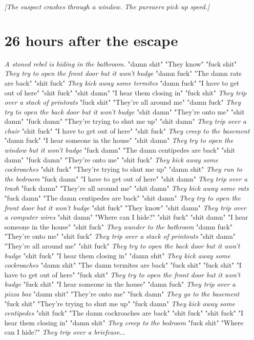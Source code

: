 \documentclass{report}
\begin{document}
\textit{[The suspect crashes through a window. The pursuers pick up speed.]}


\section*{26 \small{hours after the escape}}

\textit{A stoned rebel is hiding in the bathroom.} "damn shit" "They know" "fuck shit" \textit{They try to open the front door but it won't budge} "damn fuck" "The damn rats are back" "shit fuck" \textit{They kick away some termites} "damn fuck" "I have to get out of here" "shit fuck" \textit{} "shit damn" "I hear them closing in" "fuck shit" \textit{They trip over a stack of printouts} "fuck shit" "They're all around me" "damn fuck" \textit{They try to open the back door but it won't budge} "shit damn" "They're onto me" "shit damn" \textit{} "fuck damn" "They're trying to shut me up" "shit damn" \textit{They trip over a chair} "shit fuck" "I have to get out of here" "shit fuck" \textit{They creep to the basement} "damn fuck" "I hear someone in the house" "shit damn" \textit{They try to open the window but it won't budge} "fuck damn" "The damn centipedes are back" "shit damn" \textit{} "fuck damn" "They're onto me" "shit fuck" \textit{They kick away some cockroaches} "shit fuck" "They're trying to shut me up" "damn shit" \textit{They run to the bedroom} "fuck damn" "I have to get out of here" "shit damn" \textit{They trip over a trash} "fuck damn" "They're all around me" "shit damn" \textit{They kick away some rats} "fuck damn" "The damn centipedes are back" "shit damn" \textit{They try to open the front door but it won't budge} "shit fuck" "They know" "shit damn" \textit{They trip over a computer wires} "shit damn" "Where can I hide?" "shit fuck" \textit{} "shit damn" "I hear someone in the house" "shit fuck" \textit{They wander to the bathroom} "damn fuck" "They're onto me" "shit fuck" \textit{They trip over a stack of printouts} "shit damn" "They're all around me" "shit fuck" \textit{They try to open the back door but it won't budge} "shit fuck" "I hear them closing in" "damn shit" \textit{They kick away some cockroaches} "damn shit" "The damn termites are back" "fuck shit" \textit{} "fuck shit" "I have to get out of here" "fuck shit" \textit{They try to open the front door but it won't budge} "fuck shit" "I hear someone in the house" "damn fuck" \textit{They trip over a pizza box} "damn shit" "They're onto me" "fuck damn" \textit{They go to the basement} "fuck shit" "They're trying to shut me up" "fuck damn" \textit{They kick away some centipedes} "shit fuck" "The damn cockroaches are back" "shit fuck" \textit{} "shit fuck" "I hear them closing in" "damn shit" \textit{They creep to the bedroom} "fuck shit" "Where can I hide?" \textit{They trip over a briefcase}...
\end{document}
